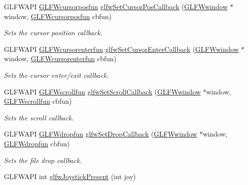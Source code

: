 \begin{CompactItemize}
GLFWAPI \hyperlink{group__input_g592fbfef76d88f027cb1bc4c36ebd437}{GLFWcursorposfun} \hyperlink{group__input_g9c49c0d3d3c775c3124726f1d902124d}{glfwSetCursorPosCallback} (\hyperlink{group__window_g3c96d80d363e67d13a41b5d1821f3242}{GLFWwindow} $\ast$window, \hyperlink{group__input_g592fbfef76d88f027cb1bc4c36ebd437}{GLFWcursorposfun} cbfun)
\begin{CompactList}\small\item\em Sets the cursor position callback. \item\end{CompactList}\item 
GLFWAPI \hyperlink{group__input_g762d898d9b0241d7e3e3b767c6cf318f}{GLFWcursorenterfun} \hyperlink{group__input_ga20014985561efeb2c53f1956f727830}{glfwSetCursorEnterCallback} (\hyperlink{group__window_g3c96d80d363e67d13a41b5d1821f3242}{GLFWwindow} $\ast$window, \hyperlink{group__input_g762d898d9b0241d7e3e3b767c6cf318f}{GLFWcursorenterfun} cbfun)
\begin{CompactList}\small\item\em Sets the cursor enter/exit callback. \item\end{CompactList}\item 
GLFWAPI \hyperlink{group__input_g6228cdf94d28fbd3a9a1fbb0e5922a8a}{GLFWscrollfun} \hyperlink{group__input_g29011514e93368712a3063a28707ced3}{glfwSetScrollCallback} (\hyperlink{group__window_g3c96d80d363e67d13a41b5d1821f3242}{GLFWwindow} $\ast$window, \hyperlink{group__input_g6228cdf94d28fbd3a9a1fbb0e5922a8a}{GLFWscrollfun} cbfun)
\begin{CompactList}\small\item\em Sets the scroll callback. \item\end{CompactList}\item 
GLFWAPI \hyperlink{group__input_gcc95e259ad21d4f666faa6280d4018fd}{GLFWdropfun} \hyperlink{group__input_gd4fc40df63a5d0441ab06de9a585cc04}{glfwSetDropCallback} (\hyperlink{group__window_g3c96d80d363e67d13a41b5d1821f3242}{GLFWwindow} $\ast$window, \hyperlink{group__input_gcc95e259ad21d4f666faa6280d4018fd}{GLFWdropfun} cbfun)
\begin{CompactList}\small\item\em Sets the file drop callback. \item\end{CompactList}\item 
GLFWAPI int \hyperlink{group__input_g7f81f22f355f4b7d315caf73cdfd9906}{glfwJoystickPresent} (int joy)

\end{CompactItemize}
